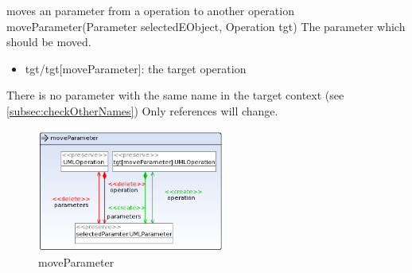 {moves an parameter from a operation to another operation}
{moveParameter(Parameter selectedEObject, Operation tgt)}
{The parameter which should be moved.}
{
\begin{itemize}
 \item tgt/tgt[moveParameter]: the target operation
\end{itemize}
}
{There is no parameter with the same name in the target context (see
\ref{subsec:checkOtherNames})}
{Only references will change.}
\begin{figure}[H]
  \centering
  \includegraphics[width=0.55\textwidth]{pics/moveParameter.png}
  \caption{moveParameter}
  \label{moveParameter}
\end{figure}